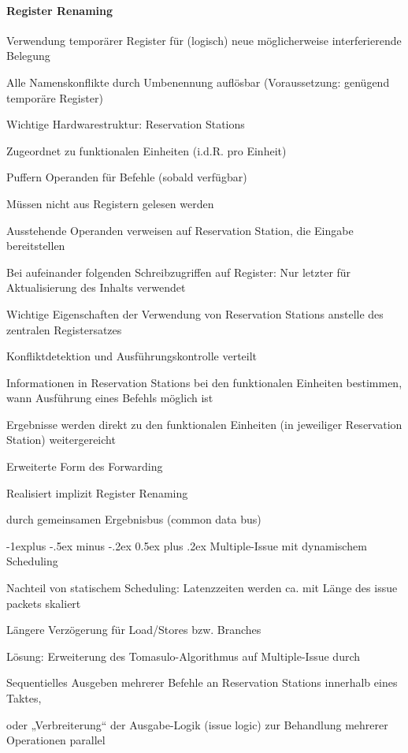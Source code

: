 \documentclass[10pt,landscape]{article}
\makeatletter
\renewcommand{\subsection}{\@startsection{subsection}{2}{0mm}%
                                {-1explus -.5ex minus -.2ex}%
                                {0.5ex plus .2ex}%
                                {\normalfont\normalsize\bfseries}}
\makeatother
\begin{document}
\begin{multicols}{3}
  \paragraph{ Register Renaming}
  \begin{itemize*}
    \item Verwendung temporärer Register für (logisch) neue möglicherweise interferierende Belegung
    \item Alle Namenskonflikte durch Umbenennung auflösbar (Voraussetzung: genügend temporäre Register)
    \item Wichtige Hardwarestruktur: Reservation Stations
    \item Zugeordnet zu funktionalen Einheiten (i.d.R. pro Einheit)
    \item Puffern Operanden für Befehle (sobald verfügbar)
    \item Müssen nicht aus Registern gelesen werden
    \item Ausstehende Operanden verweisen auf Reservation Station, die Eingabe bereitstellen
    \item Bei aufeinander folgenden Schreibzugriffen auf Register: Nur letzter für Aktualisierung des Inhalts verwendet
    \item Wichtige Eigenschaften der Verwendung von Reservation Stations anstelle des zentralen Registersatzes
    \item Konfliktdetektion und Ausführungskontrolle verteilt
    \item Informationen in Reservation Stations bei den funktionalen Einheiten bestimmen, wann Ausführung eines Befehls möglich ist
    \item Ergebnisse werden direkt zu den funktionalen Einheiten (in jeweiliger Reservation Station) weitergereicht
    \item Erweiterte Form des Forwarding
    \item Realisiert implizit Register Renaming
    \item durch gemeinsamen Ergebnisbus (common data bus)
  \end{itemize*}
  
  \subsection{ Multiple-Issue mit dynamischem Scheduling}
  \begin{itemize*}
    \item Nachteil von statischem Scheduling: Latenzzeiten werden ca. mit Länge des issue packets skaliert
    \item Längere Verzögerung für Load/Stores bzw. Branches
    \item Lösung: Erweiterung des Tomasulo-Algorithmus auf Multiple-Issue durch
    \item Sequentielles Ausgeben mehrerer Befehle an Reservation Stations innerhalb eines Taktes,
    \item oder „Verbreiterung“ der Ausgabe-Logik (issue logic) zur Behandlung mehrerer Operationen parallel
  \end{itemize*}
  

\end{multicols}
\end{document}
